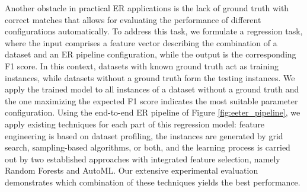 Another obstacle in practical ER applications is the lack of ground truth with correct matches that allows for
evaluating the performance of different configurations automatically.
To address this task, we formulate a regression task, where the input comprises a feature vector describing the combination of a dataset and an ER pipeline configuration, while the output is the corresponding F1 score. In this context, datasets with known ground truth act as training instances, while datasets without a ground truth form the testing instances. We apply the trained model to all instances of a dataset without a ground truth and the one maximizing the expected F1 score indicates the most suitable parameter configuration. Using the end-to-end ER pipeline of Figure \ref{fig:eeter_pipeline}, we apply existing techniques for each part of this regression model: feature engineering is based on dataset profiling, the instances are generated by grid search, sampling-based algorithms, or both, and the learning process is carried out by two established approaches with integrated feature selection, namely Random Forests and AutoML. Our extensive experimental evaluation demonstrates which combination of these techniques yields the best performance.
